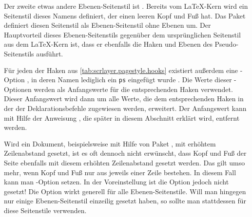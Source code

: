 Der zweite etwas andere Ebenen-Seitenstil ist
. Bereits vom \LaTeX-Kern wird
ein Seitenstil dieses Namens definiert, der einen leeren Kopf und Fuß hat. Das
Paket  definiert diesen Seitenstil als Ebenen-Seitenstil
ohne Ebenen um. %
Der Hauptvorteil dieses Ebenen-Seitenstils gegenüber dem ursprünglichen
Seitenstil aus dem \LaTeX-Kern ist, dass er ebenfalls die Haken
und Ebenen des Pseudo-Seitenstils  ausführt.%
\EndIndexGroup


\begin{Declaration}
\end{Declaration}
%
%
Für jeden der Haken aus \autoref{tab:scrlayer.pagestyle.hooks}
existiert außerdem eine \KOMAScript-Option%
\iffalse%
. Die Namen der \KOMAScript-Optionen ähneln den Namen der Optionen für die
Befehle zur Deklaration von Ebenen-Seitenstilen. Es wird lediglich ein
»\texttt{ps}« nach dem »\texttt{on}« am Anfang des Namens eingefügt%
\else%
, in deren Namen lediglich ein \texttt{ps} eingefügt wurde%
\fi%
. Die Werte dieser \KOMAScript-Optionen werden als Anfangswerte für die
entsprechenden Haken verwendet. Dieser Anfangswert wird dann um alle Werte,
die dem entsprechenden Haken in der  der
Deklarationsbefehle zugewiesen werden, erweitert. Der Anfangswert kann mit
Hilfe der Anweisung , die
später in diesem Abschnitt erklärt wird, entfernt werden.%
\EndIndexGroup


\begin{Declaration}
\end{Declaration}
Wird ein
Dokument, beispielsweise mit Hilfe von Paket
, mit
erhöhtem Zeilenabstand gesetzt, ist es oft dennoch nicht erwünscht, dass Kopf
und Fuß der Seite ebenfalls mit diesem erhöhten Zeilenabstand gesetzt
werden. Das gilt umso mehr, wenn Kopf und Fuß nur aus jeweils einer Zeile
bestehen. In diesem Fall kann man \KOMAScript-Option 
setzen. In der Voreinstellung ist die Option jedoch
nicht gesetzt! Die Option wirkt generell für alle Ebenen-Seitenstile. Will man
hingegen nur einige Ebenen-Seitenstil einzeilig gesetzt haben, so sollte man
stattdessen für diese Seitenstile
verwenden.%
\EndIndexGroup


